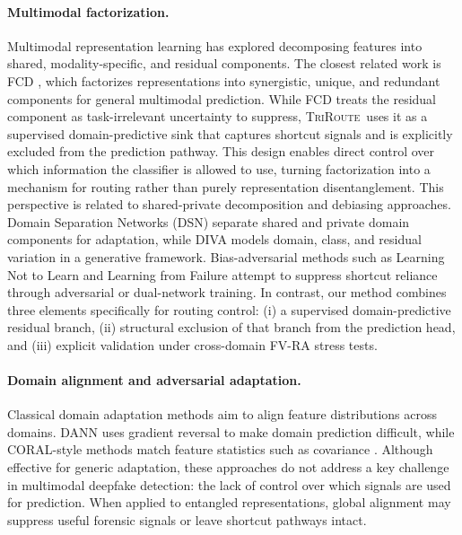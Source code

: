 \documentclass{article}
\newcommand{\method}{\textsc{TriRoute}}
\begin{document}
\vspace{-1em}
\paragraph{Multimodal factorization.}
Multimodal representation learning has explored decomposing features into shared, modality-specific, and residual components. The closest related work is FCD \citep{liu2025fcd}, which factorizes representations into synergistic, unique, and redundant components for general multimodal prediction. 
While FCD treats the residual component as task-irrelevant uncertainty to suppress, \method\ uses it as a supervised domain-predictive sink that captures shortcut signals and is explicitly excluded from the prediction pathway. This design enables direct control over which information the classifier is allowed to use, turning factorization into a mechanism for routing rather than purely representation disentanglement.
This perspective is related to shared-private decomposition and debiasing approaches. Domain Separation Networks (DSN) \citep{bousmalis2016dsn} separate shared and private domain components for adaptation, while DIVA \citep{ilse2019diva} models domain, class, and residual variation in a generative framework. Bias-adversarial methods such as Learning Not to Learn \citep{kim2019learningnottolearn} and Learning from Failure \citep{nam2020learningfromfailure} attempt to suppress shortcut reliance through adversarial or dual-network training. 
In contrast, our method combines three elements specifically for routing control: (i) a supervised domain-predictive residual branch, (ii) structural exclusion of that branch from the prediction head, and (iii) explicit validation under cross-domain FV-RA stress tests.

\vspace{-1em}
\paragraph{Domain alignment and adversarial adaptation.}
Classical domain adaptation methods aim to align feature distributions across domains. DANN \citep{ganin2016dann} uses gradient reversal to make domain prediction difficult, while CORAL-style methods match feature statistics such as covariance \citep{sun2016deepcoral}. 
Although effective for generic adaptation, these approaches do not address a key challenge in multimodal deepfake detection: the lack of control over which signals are used for prediction. When applied to entangled representations, global alignment may suppress useful forensic signals or leave shortcut pathways intact. 
\end{document}
